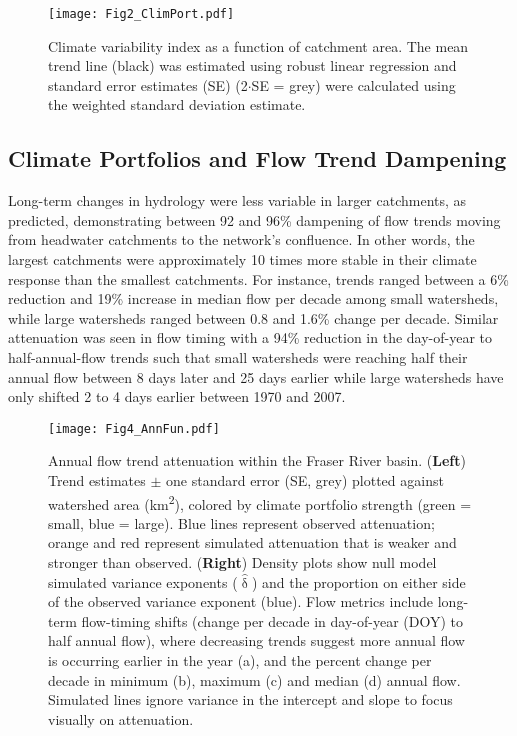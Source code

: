 \documentclass[draft,linenumbers]{AGUJournal}
\begin{document}
\begin{figure}[h]
\centering
\texttt{[image: Fig2\_ClimPort.pdf]}
	\caption{Climate variability index as a function of catchment area. The mean trend line (black) was estimated using robust linear regression and standard error estimates (SE) (2$\cdot$SE = grey) were calculated using the weighted standard deviation estimate.}
\label{fig:2}
\end{figure}

\subsection{Climate Portfolios and Flow Trend Dampening}

Long-term changes in hydrology were less variable in larger catchments, as predicted, demonstrating between 92 and 96\% dampening of flow trends moving from headwater catchments to the network's confluence. In other words, the largest catchments were approximately 10 times more stable in their climate response than the smallest catchments. For instance, trends ranged between a 6\% reduction and 19\% increase in median flow per decade among small watersheds, while large watersheds ranged between 0.8 and 1.6\% change per decade. Similar attenuation was seen in flow timing with a 94\% reduction in the day-of-year to half-annual-flow trends such that small watersheds were reaching half their annual flow between 8 days later and 25 days earlier while large watersheds have only shifted 2 to 4 days earlier between 1970 and 2007.

\begin{figure}[h]
\centering
\texttt{[image: Fig4\_AnnFun.pdf]}
	\caption{Annual flow trend attenuation within the Fraser River basin. (\textbf{Left}) Trend estimates $\pm$ one standard error (SE, grey) plotted against watershed area (km\textsuperscript{2}), colored by climate portfolio strength (green = small, blue = large). Blue lines represent observed attenuation; orange and red represent simulated attenuation that is weaker and stronger than observed. (\textbf{Right}) Density plots show null model simulated variance exponents ($\hat{\updelta}$) and the proportion on either side of the observed variance exponent (blue). Flow metrics include long-term flow-timing shifts (change per decade in day-of-year (DOY) to half annual flow), where decreasing trends suggest more annual flow is occurring earlier in the year (a), and the percent change per decade in minimum (b), maximum (c) and median (d) annual flow. Simulated lines ignore variance in the intercept and slope to focus visually on attenuation.}
\label{fig:3}
\end{figure}
\end{document}
